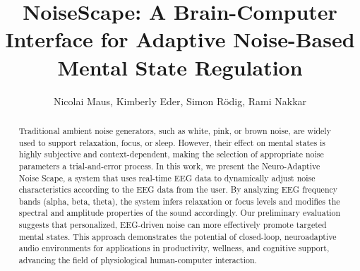 \documentclass[sigconf, nonacm, screen=True, review=True, anonymous=False, authordraft=False]{acmart}
\begin{document}
\title{NoiseScape: A Brain-Computer Interface for Adaptive Noise-Based Mental State Regulation}

\author{Nicolai Maus, Kimberly Eder, Simon Rödig, Rami Nakkar}

\begin{abstract}
Traditional ambient noise generators, such as white, pink, or brown noise, are widely used to support relaxation, focus, or sleep. However, their effect on mental states is highly subjective and context-dependent, making the selection of appropriate noise parameters a trial-and-error process. In this work, we present the Neuro-Adaptive Noise Scape, a system that uses real-time EEG data to dynamically adjust noise characteristics according to the EEG data from the user. By analyzing EEG frequency bands (alpha, beta, theta), the system infers relaxation or focus levels and modifies the spectral and amplitude properties of the sound accordingly. Our preliminary evaluation suggests that personalized, EEG-driven noise can more effectively promote targeted mental states. This approach demonstrates the potential of closed-loop, neuroadaptive audio environments for applications in productivity, wellness, and cognitive support, advancing the field of physiological human-computer interaction.
\end{abstract}







\maketitle






\appendix
\end{document}

